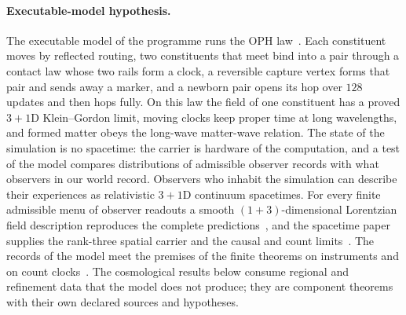 \paragraph{Executable-model hypothesis.}
The executable model of the programme runs the OPH law~\cite{ophmodel}. Each
constituent moves by reflected routing, two constituents that meet bind into
a pair through a contact law whose two rails form a clock, a reversible
capture vertex forms that pair and sends away a marker, and a newborn pair
opens its hop over $128$ updates and then hops fully. On this law the field of one constituent has a proved $3{+}1$D Klein--Gordon
limit, moving clocks keep proper time at long wavelengths, and formed matter
obeys the long-wave matter-wave relation. The state of
the simulation is no spacetime: the carrier is hardware of the computation,
and a test of the model compares distributions of admissible observer records
with what observers in our world record. Observers who inhabit the simulation
can describe their experiences as relativistic $3{+}1$D continuum
spacetimes. For every finite admissible menu of observer readouts a smooth
$(1+3)$-dimensional Lorentzian field description reproduces the complete
predictions~\cite{ophsynthesis,ophEinstein}, and the spacetime paper supplies
the rank-three spatial carrier and the causal and count
limits~\cite{ophEinstein}. The records of the model meet the premises of the
finite theorems on instruments and on count clocks~\cite{ophmodel}. The cosmological results below consume regional
and refinement data that the model does not produce; they are component
theorems with their own declared sources and hypotheses.
